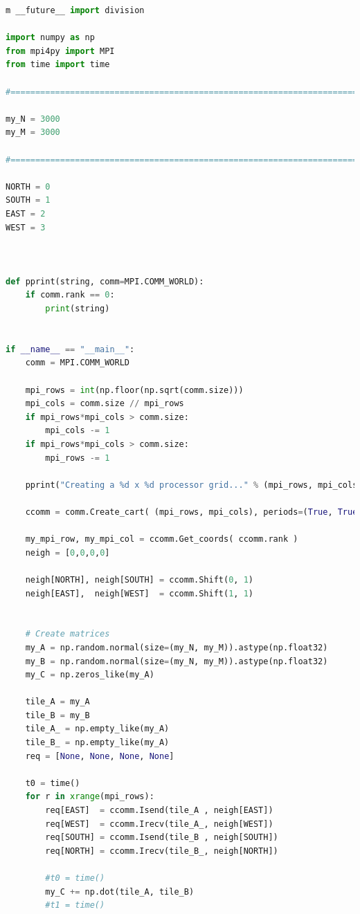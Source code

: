 \documentclass[10pt,t]{beamer}
\begin{document}
\begin{frame}
\begin{lstlisting}[language=Python,basicstyle=\fontsize{4}{5}\selectfont\ttfamily]
m __future__ import division

import numpy as np
from mpi4py import MPI
from time import time

#=============================================================================#

my_N = 3000
my_M = 3000

#=============================================================================#

NORTH = 0
SOUTH = 1
EAST = 2
WEST = 3



def pprint(string, comm=MPI.COMM_WORLD):
    if comm.rank == 0:
        print(string)


if __name__ == "__main__":
    comm = MPI.COMM_WORLD

    mpi_rows = int(np.floor(np.sqrt(comm.size)))
    mpi_cols = comm.size // mpi_rows
    if mpi_rows*mpi_cols > comm.size:
        mpi_cols -= 1
    if mpi_rows*mpi_cols > comm.size:
        mpi_rows -= 1

    pprint("Creating a %d x %d processor grid..." % (mpi_rows, mpi_cols) )

    ccomm = comm.Create_cart( (mpi_rows, mpi_cols), periods=(True, True), reorder=True)

    my_mpi_row, my_mpi_col = ccomm.Get_coords( ccomm.rank )
    neigh = [0,0,0,0]

    neigh[NORTH], neigh[SOUTH] = ccomm.Shift(0, 1)
    neigh[EAST],  neigh[WEST]  = ccomm.Shift(1, 1)


    # Create matrices
    my_A = np.random.normal(size=(my_N, my_M)).astype(np.float32)
    my_B = np.random.normal(size=(my_N, my_M)).astype(np.float32)
    my_C = np.zeros_like(my_A)

    tile_A = my_A
    tile_B = my_B
    tile_A_ = np.empty_like(my_A)
    tile_B_ = np.empty_like(my_A)
    req = [None, None, None, None]

    t0 = time()
    for r in xrange(mpi_rows):
        req[EAST]  = ccomm.Isend(tile_A , neigh[EAST])
        req[WEST]  = ccomm.Irecv(tile_A_, neigh[WEST])
        req[SOUTH] = ccomm.Isend(tile_B , neigh[SOUTH])
        req[NORTH] = ccomm.Irecv(tile_B_, neigh[NORTH])

        #t0 = time()
        my_C += np.dot(tile_A, tile_B)
        #t1 = time()


\end{lstlisting}
\end{frame}
\end{document}
